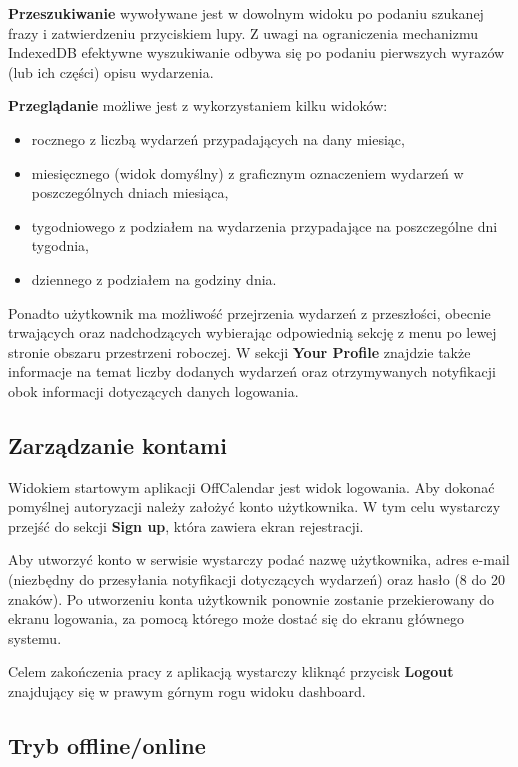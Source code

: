 \textbf{Przeszukiwanie} wywoływane jest w dowolnym widoku po podaniu szukanej frazy i zatwierdzeniu przyciskiem lupy. Z uwagi na ograniczenia mechanizmu IndexedDB efektywne wyszukiwanie odbywa się po podaniu pierwszych wyrazów (lub ich części) opisu wydarzenia.

\textbf{Przeglądanie} możliwe jest z wykorzystaniem kilku widoków:

\begin{itemize}
\item rocznego z liczbą wydarzeń przypadających na dany miesiąc,
\item miesięcznego (widok domyślny) z graficznym oznaczeniem wydarzeń w poszczególnych dniach miesiąca,
\item tygodniowego z podziałem na wydarzenia przypadające na poszczególne dni tygodnia,
\item dziennego z podziałem na godziny dnia.
\end{itemize}

Ponadto użytkownik ma możliwość przejrzenia wydarzeń z przeszłości, obecnie trwających oraz nadchodzących wybierając odpowiednią sekcję z menu po lewej stronie obszaru przestrzeni roboczej. W sekcji \textbf{Your Profile} znajdzie także informacje na temat liczby dodanych wydarzeń oraz otrzymywanych notyfikacji obok informacji dotyczących danych logowania.

\subsection{Zarządzanie kontami}
\label{sec:zarzKont}

Widokiem startowym aplikacji OffCalendar jest widok logowania. Aby dokonać pomyślnej autoryzacji należy założyć konto użytkownika. W tym celu wystarczy przejść do sekcji \textbf{Sign up}, która zawiera ekran rejestracji.

Aby utworzyć konto w serwisie wystarczy podać nazwę użytkownika, adres e-mail (niezbędny do przesyłania notyfikacji dotyczących wydarzeń) oraz hasło (8 do 20 znaków). Po utworzeniu konta użytkownik ponownie zostanie przekierowany do ekranu logowania, za pomocą którego może dostać się do ekranu głównego systemu.

Celem zakończenia pracy z aplikacją wystarczy kliknąć przycisk \textbf{Logout} znajdujący się w prawym górnym rogu widoku dashboard.

\subsection{Tryb offline/online}
\label{sec:instrTrybOffOn}

